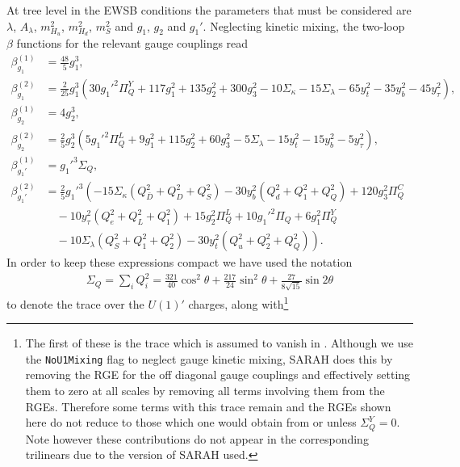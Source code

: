 \documentclass[preprint,amsmath,amssymb,aps,superscriptaddress,prd,
showpacs,floatfix,nofootinbib]{revtex4-1}
\begin{document}
At tree level in the EWSB conditions the parameters that must be considered
are $\lambda$, $A_\lambda$, $m_{H_u}^2$, $m_{H_d}^2$, $m_S^2$ and $g_1$, $g_2$
and $g_1'$.  Neglecting kinetic mixing, the two-loop $\beta$ functions for
the relevant gauge couplings read
\begin{subequations} \label{eq:USSMGaugeBetas}
\begin{align}
\beta_{g_1}^{(1)} &= \frac{48}{5} g_1^3 , \label{eq:USSMg1BetaOneLoop} \\
\beta_{g_1}^{(2)} &= \frac{2}{25} g_1^3 \left ( 30 g_1'^2 \Pi_{Q}^Y +
117 g_1^2 + 135 g_2^2 + 300 g_3^2 - 10 \Sigma_{\kappa } - 15 \Sigma_{\lambda }
- 65 y_t^2 - 35 y_b^2 - 45 y_{\tau }^2 \right ) , \label{eq:USSMg1BetaTwoLoop}\\
\beta_{g_2}^{(1)} &= 4 g_2^3 , \label{eq:USSMg2BetaOneLoop} \\
\beta_{g_2}^{(2)} &= \frac{2}{5} g_2^3 \left ( 5 g_1'^2 \Pi _{Q}^L + 9 g_1^2
+ 115 g_2^2 + 60 g_3^2 - 5 \Sigma_{\lambda } - 15 y_t^2 - 15 y_b^2 -
5 y_{\tau }^2 \right) , \label{eq:USSMg2BetaTwoLoop} \\
\beta_{g_1'}^{(1)} &= g_1'^3 \Sigma_{Q} , \label{eq:USSMg1pBetaOneLoop} \\
\beta_{g_1'}^{(2)} &= \frac{2}{5} g_1'^3 \left ( -15 \Sigma_{\kappa } \left (
Q_{\bar{D}}^2 + Q_D^2 + Q_S^2 \right ) - 30 y_b^2 \left ( Q_d^2 + Q_1^2 +
Q_Q^2 \right ) + 120 g_3^2 \Pi_{Q}^C \right . \nonumber \\
& \quad {} - 10 y_{\tau }^2 \left ( Q_e^2 + Q_L^2 + Q_1^2 \right ) +
15 g_2^2 \Pi_{Q}^L + 10 g_1'^2 \Pi_{Q} + 6 g_1^2 \Pi_{Q}^Y \nonumber \\
& \quad \left . {} - 10 \Sigma_{\lambda } \left ( Q_S^2 + Q_1^2 + Q_2^2
\right ) - 30 y_t^2 \left ( Q_u^2 + Q_2^2 + Q_Q^2 \right ) \right ) .
\label{eq:USSMg1pBetaTwoLoop}
\end{align}
\end{subequations}
In order to keep these expressions compact we have used the notation
\begin{align*}
\Sigma_{Q} = \sum_i Q_i^2 = \frac{321}{40} \cos^2\theta +
\frac{217}{24} \sin^2\theta + \frac{27}{8 \sqrt{15}} \sin 2\theta
\end{align*}
to denote the trace over the $U(1)'$ charges, along
with\footnote{The first of these is the trace which is assumed to vanish in
\cite{Martin:1993zk}.  Although we use the \texttt{NoU1Mixing} flag to neglect
gauge kinetic mixing, SARAH does this by removing the RGE for
the off diagonal gauge couplings and effectively setting them to
zero at all scales by removing all terms involving them from the
RGEs.  Therefore some terms with this trace remain and the RGEs shown here
do not reduce to those which one would obtain from
\cite{Martin:1993zk} or \cite{Athron:2009bs} unless $\Sigma_{Q}^Y = 0$.
Note however these contributions do not appear in the
corresponding trilinears due to the version of SARAH used.}
\end{document}
